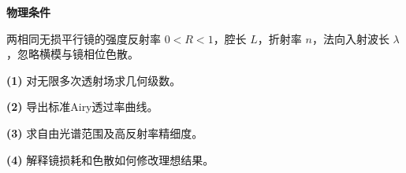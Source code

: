\textbf{物理条件}\par 两相同无损平行镜的强度反射率 \(0<R<1\)，腔长 \(L\)，折射率 \(n\)，法向入射波长 \(\lambda\)，忽略横模与镜相位色散。
\par\noindent\textbf{(1)} 对无限多次透射场求几何级数。
\par\noindent\textbf{(2)} 导出标准Airy透过率曲线。
\par\noindent\textbf{(3)} 求自由光谱范围及高反射率精细度。
\par\noindent\textbf{(4)} 解释镜损耗和色散如何修改理想结果。
